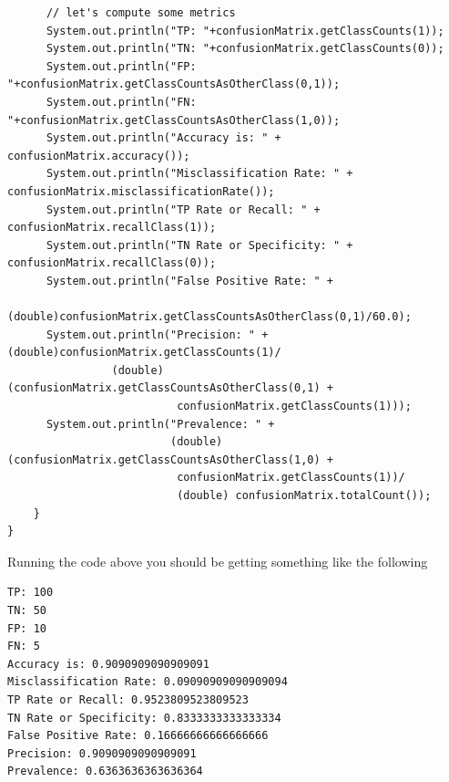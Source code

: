 \begin{verbatim}
      // let's compute some metrics
      System.out.println("TP: "+confusionMatrix.getClassCounts(1));
      System.out.println("TN: "+confusionMatrix.getClassCounts(0));
      System.out.println("FP: "+confusionMatrix.getClassCountsAsOtherClass(0,1));
      System.out.println("FN: "+confusionMatrix.getClassCountsAsOtherClass(1,0));
      System.out.println("Accuracy is: " + confusionMatrix.accuracy());
      System.out.println("Misclassification Rate: " + confusionMatrix.misclassificationRate());
      System.out.println("TP Rate or Recall: " + confusionMatrix.recallClass(1));
      System.out.println("TN Rate or Specificity: " + confusionMatrix.recallClass(0));
      System.out.println("False Positive Rate: " + 
                         (double)confusionMatrix.getClassCountsAsOtherClass(0,1)/60.0);
      System.out.println("Precision: " + (double)confusionMatrix.getClassCounts(1)/
                (double) (confusionMatrix.getClassCountsAsOtherClass(0,1) + 
                          confusionMatrix.getClassCounts(1)));
      System.out.println("Prevalence: " + 
                         (double)(confusionMatrix.getClassCountsAsOtherClass(1,0) +
                          confusionMatrix.getClassCounts(1))/
                          (double) confusionMatrix.totalCount());
    }
}
\end{verbatim}  

Running the code above you should be getting something like the following

\begin{verbatim}
TP: 100
TN: 50
FP: 10
FN: 5
Accuracy is: 0.9090909090909091
Misclassification Rate: 0.09090909090909094
TP Rate or Recall: 0.9523809523809523
TN Rate or Specificity: 0.8333333333333334
False Positive Rate: 0.16666666666666666
Precision: 0.9090909090909091
Prevalence: 0.6363636363636364
\end{verbatim}

